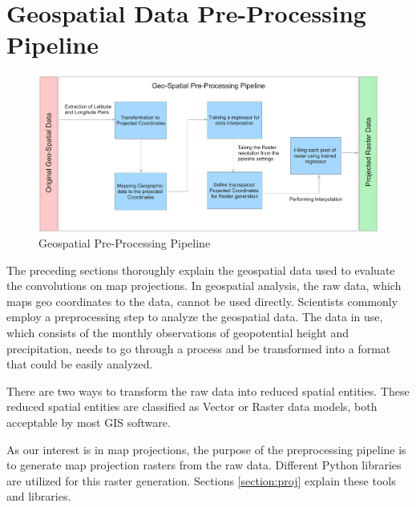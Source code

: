 \newpage
\clearpage
\cleardoublepage

\chapter{Geospatial Data Pre-Processing Pipeline}
\label{chap:preprocess}
\begin{figure}[h]
    \centering
    \includegraphics[width=1.0\linewidth]{figures/chapter-7/pipeline.png}
    \caption{Geospatial Pre-Processing Pipeline}
    \label{fig:preprocessingpipeline}
\end{figure}
The preceding sections thoroughly explain the geospatial data used to evaluate the convolutions on map projections. In geospatial analysis, the raw data, which maps geo coordinates to the data, cannot be used directly. Scientists commonly employ a preprocessing step to analyze the geospatial data. The data in use, which consists of the monthly observations of geopotential height and precipitation, needs to go through a process and be transformed into a format that could be easily analyzed.

There are two ways to transform the raw data into reduced spatial entities. These reduced spatial entities are classified as Vector or Raster data models, both acceptable by most GIS software.

As our interest is in map projections, the purpose of the preprocessing pipeline is to generate map projection rasters from the raw data. Different Python libraries are utilized for this raster generation.
Sections \autoref{section:proj} explain these tools and libraries.

